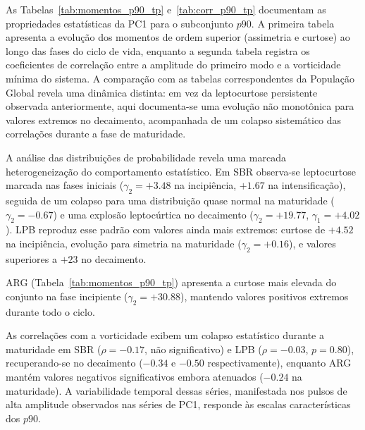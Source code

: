 As Tabelas~\ref{tab:momentos_p90_tp} e~\ref{tab:corr_p90_tp} documentam as propriedades estatísticas da PC1 para o subconjunto $p90$. A primeira tabela apresenta a evolução dos momentos de ordem superior (assimetria e curtose) ao longo das fases do ciclo de vida, enquanto a segunda tabela registra os coeficientes de correlação entre a amplitude do primeiro modo e a vorticidade mínima do sistema.
A comparação com as tabelas correspondentes da População Global revela uma dinâmica distinta: em vez da leptocurtose persistente observada anteriormente, aqui documenta-se uma evolução não monotônica para valores extremos no decaimento, acompanhada de um colapso sistemático das correlações durante a fase de maturidade.

A análise das distribuições de probabilidade revela uma marcada heterogeneização do comportamento estatístico.
Em SBR observa-se leptocurtose marcada nas fases iniciais ($\gamma_2 = +3.48$ na incipiência, $+1.67$ na intensificação), seguida de um colapso para uma distribuição quase normal na maturidade ($\gamma_2 = -0.67$) e uma explosão leptocúrtica no decaimento ($\gamma_2 = +19.77$, $\gamma_1 = +4.02$).
LPB reproduz esse padrão com valores ainda mais extremos: curtose de $+4.52$ na incipiência, evolução para simetria na maturidade ($\gamma_2 = +0.16$), e valores superiores a $+23$ no decaimento.

ARG (Tabela~\ref{tab:momentos_p90_tp}) apresenta a curtose mais elevada do conjunto na fase incipiente ($\gamma_2 = +30.88$), mantendo valores positivos extremos durante todo o ciclo.

As correlações com a vorticidade exibem um colapso estatístico durante a maturidade em SBR ($\rho = -0.17$, não significativo) e LPB ($\rho = -0.03$, $p = 0.80$), recuperando-se no decaimento ($-0.34$ e $-0.50$ respectivamente), enquanto ARG mantém valores negativos significativos embora atenuados ($-0.24$ na maturidade).
A variabilidade temporal dessas séries, manifestada nos pulsos de alta amplitude observados nas séries de PC1, responde às escalas características dos $p90$.

